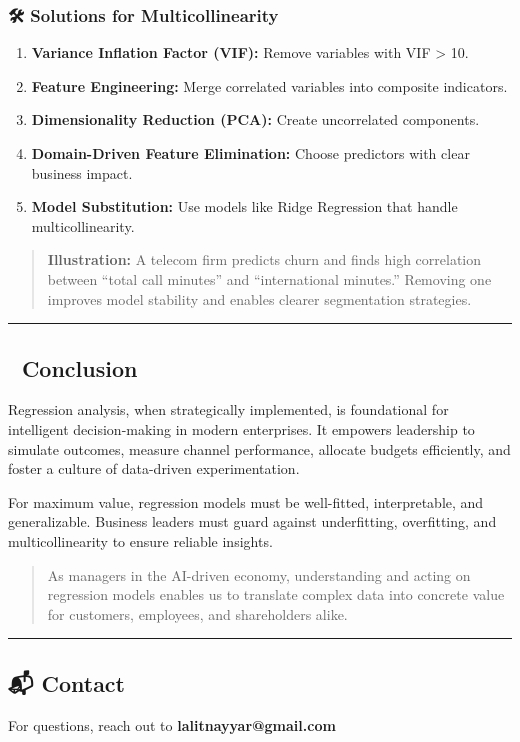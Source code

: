 \subsubsection{🛠️ Solutions for
Multicollinearity}\label{solutions-for-multicollinearity}

\begin{enumerate}
\def\labelenumi{\arabic{enumi}.}
\tightlist
\item
  \textbf{Variance Inflation Factor (VIF):} Remove variables with VIF
  \textgreater{} 10.
\item
  \textbf{Feature Engineering:} Merge correlated variables into
  composite indicators.
\item
  \textbf{Dimensionality Reduction (PCA):} Create uncorrelated
  components.
\item
  \textbf{Domain-Driven Feature Elimination:} Choose predictors with
  clear business impact.
\item
  \textbf{Model Substitution:} Use models like Ridge Regression that
  handle multicollinearity.
\end{enumerate}

\begin{quote}
\textbf{Illustration:} A telecom firm predicts churn and finds high
correlation between ``total call minutes'' and ``international
minutes.'' Removing one improves model stability and enables clearer
segmentation strategies.
\end{quote}

\begin{center}\rule{0.5\linewidth}{0.5pt}\end{center}

\subsection{🏁 Conclusion}\label{conclusion}

Regression analysis, when strategically implemented, is foundational for
intelligent decision-making in modern enterprises. It empowers
leadership to simulate outcomes, measure channel performance, allocate
budgets efficiently, and foster a culture of data-driven
experimentation.

For maximum value, regression models must be well-fitted, interpretable,
and generalizable. Business leaders must guard against underfitting,
overfitting, and multicollinearity to ensure reliable insights.

\begin{quote}
As managers in the AI-driven economy, understanding and acting on
regression models enables us to translate complex data into concrete
value for customers, employees, and shareholders alike.
\end{quote}

\begin{center}\rule{0.5\linewidth}{0.5pt}\end{center}

\subsection{📬 Contact}\label{contact}

For questions, reach out to \textbf{lalitnayyar@gmail.com}
